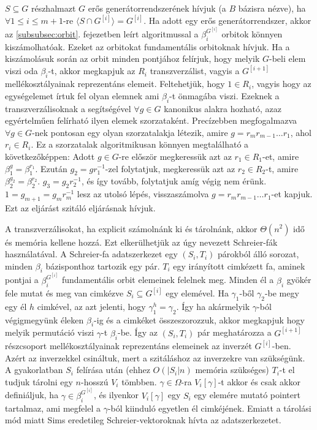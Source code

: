 $S \subseteq G$ részhalmazt $G$ erős generátorrendszerének hívjuk (a $B$ bázisra nézve), ha $\forall 1\le i \le m+1$-re $\langle S \cap G^{[i]} \rangle = G^{[i]}$.
Ha adott egy erős generátorrendszer, akkor az \ref{subsubsec:orbit}. fejezetben leírt algoritmussal a $\beta_i^{G^{[i]}}$ orbitok könnyen kiszámolhatóak.
Ezeket az orbitokat fundamentális orbitoknak hívjuk.
Ha a kiszámolásuk során az orbit minden pontjához felírjuk, hogy melyik $G$-beli elem viszi oda $\beta_i$-t, akkor megkapjuk az $R_i$ transzverzálist,
vagyis a $G^{[i+1]}$ mellékosztályainak reprezentáns elemeit.
Feltehetjük, hogy $1 \in R_i$, vagyis hogy az egységelemet írtuk fel olyan elemnek ami $\beta_i$-t önmagába viszi. Ezeknek a transzverzálisoknak a segítségével
$\forall g \in G$ kanonikus alakra hozható, azaz egyértelműen felírható ilyen elemek szorzataként.
Precízebben megfogalmazva $\forall g \in G$-nek pontosan egy olyan szorzatalakja létezik, amire $g = r_m r_{m-1} \dots r_1$, ahol $r_i \in R_i$.
Ez a szorzatalak algoritmikusan könnyen megtalálható a következőképpen: Adott $g \in G$-re először megkeressük azt az $r_1 \in R_1$-et, amire $\beta_1^g = \beta_1^{r_1}$.
Ezután $g_2 = g r_1^{-1}$-zel folytatjuk, megkeressük azt az $r_2 \in R_2$-t, amire $\beta_2^{g_2} = \beta_2^{r_2}$. $g_3 = g_2 r_2^{-1}$, és így tovább, folytatjuk amíg végig nem érünk.
$1 = g_{m+1} = g_{m} r_m^{-1}$ lesz az utolsó lépés, visszaszámolva $g = r_m r_{m-1} \dots r_1$-et kapjuk. Ezt az eljárást szitáló eljárásnak hívjuk.

A transzverzálisokat, ha explicit számolnánk ki és tárolnánk, akkor $\Theta(n^2)$ idő és memória kellene hozzá.
Ezt elkerülhetjük az úgy nevezett Schreier-fák használatával.
A Schreier-fa adatszerkezet egy $(S_i, T_i)$ párokból álló sorozat, minden $\beta_i$ bázisponthoz tartozik egy pár.
$T_i$ egy irányított cimkézett fa, aminek pontjai a $\beta_i^{G^{[i]}}$ fundamentális orbit elemeinek felelnek meg.
Minden él a $\beta_i$ gyökér fele mutat és meg van cimkézve $S_i \subseteq G^{[i]}$ egy elemével.
Ha $\gamma_1$-ből $\gamma_2$-be megy egy él $h$ cimkével, az azt jelenti, hogy $\gamma_1^h=\gamma_2$.
Így ha akármelyik $\gamma$-ból végigmegyünk éleken $\beta_i$-ig és a cimkéket összeszorozzuk, akkor megkapjuk hogy melyik
permutáció viszi $\gamma$-t $\beta_i$-be. Így az $(S_i, T_i)$ pár meghatározza a $G^{[i+1]}$ részcsoport mellékosztályainak 
reprezentáns elemeinek az inverzét $G^{[i]}$-ben. Azért az inverzekkel csináltuk, mert a szitáláshoz az inverzekre van szükségünk.
A gyakorlatban $S_i$ felírása után (ehhez $O(|S_i|n)$ memória szükséges) $T_i$-t el tudjuk tárolni egy $n$-hosszú $V_i$ tömbben.
$\gamma \in \Omega$-ra $V_i[\gamma]$-t akkor és csak akkor definiáljuk, ha $\gamma \in \beta_i^{G^{[i]}}$,
és ilyenkor $V_i[\gamma]$ egy $S_i$ egy elemére mutató pointert tartalmaz, ami megfelel a $\gamma$-ból kiinduló egyetlen él cimkéjének.
Emiatt a tárolási mód miatt Sims eredetileg Schreier-vektoroknak hívta az adatszerkezetet.

